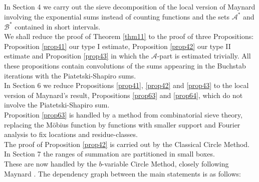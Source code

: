 \documentclass{amsart}
\numberwithin{equation}{subsection}
\begin{document}
In Section 4 we carry out the sieve decomposition of the local version of Maynard \cite{maynard} involving the exponential sums  instead of counting functions and the sets $\mathcal{A}^*$ and $\mathcal{B}^*$ contained in short intervals.\\
We shall reduce the proof of Theorem \ref{thm11} to the proof of three Propositions:\\ 
Proposition \ref{prop41} our type I estimate, Proposition \ref{prop42} our type II estimate and Proposition \ref{prop43} in which the $\mathcal{A}$-part is estimated trivially. All these propositions contain convolutions of the sums appearing in the Buchstab iterations with the Piatetski-Shapiro sums.\\
In Section 6 we reduce Propositions \ref{prop41}, \ref{prop42} and \ref{prop43} to the local version of Maynard's result, Propositions \ref{prop63} and \ref{prop64}, which do not involve the Piatetski-Shapiro sum.\\
Proposition \ref{prop63} is handled by a method from combinatorial sieve theory, replacing the M\"obius function by functions with smaller support and Fourier analysis to fix locations and residue-classes. \\
The proof of Proposition \ref{prop42} is carried out by the Classical Circle Method.\\
In Section 7 the ranges of summation are partitioned in small boxes.\\
These are now handled by the $b$-variable Circle Method, closely following Maynard \cite{maynard}. The dependency graph between the main statements is as follows:\\
\end{document}
